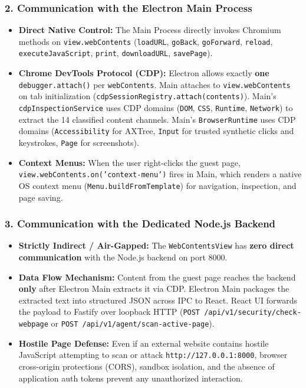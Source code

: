 \documentclass[11pt,a4paper]{article}
\begin{document}
\subsubsection{2. Communication with the Electron Main Process}
\begin{itemize}[leftmargin=1.4em]
\item \textbf{Direct Native Control:} The Main Process directly invokes Chromium methods on \texttt{view.webContents} (\texttt{loadURL}, \texttt{goBack}, \texttt{goForward}, \texttt{reload}, \texttt{executeJavaScript}, \texttt{print}, \texttt{downloadURL}, \texttt{savePage}).
\item \textbf{Chrome DevTools Protocol (CDP):} Electron allows exactly \textbf{one} \texttt{debugger.attach()} per \texttt{webContents}. Main attaches to \texttt{view.webContents} on tab initialization (\texttt{cdpSessionRegistry.attach(contents)}). Main's \texttt{cdpInspectionService} uses CDP domains (\texttt{DOM}, \texttt{CSS}, \texttt{Runtime}, \texttt{Network}) to extract the 14 classified content channels. Main's \texttt{BrowserRuntime} uses CDP domains (\texttt{Accessibility} for AXTree, \texttt{Input} for trusted synthetic clicks and keystrokes, \texttt{Page} for screenshots).
\item \textbf{Context Menus:} When the user right-clicks the guest page, \texttt{view.webContents.on('context-menu')} fires in Main, which renders a native OS context menu (\texttt{Menu.buildFromTemplate}) for navigation, inspection, and page saving.
\end{itemize}

\subsubsection{3. Communication with the Dedicated Node.js Backend}
\begin{itemize}[leftmargin=1.4em]
\item \textbf{Strictly Indirect / Air-Gapped:} The \texttt{WebContentsView} has \textbf{zero direct communication} with the Node.js backend on port 8000.
\item \textbf{Data Flow Mechanism:} Content from the guest page reaches the backend \textbf{only} after Electron Main extracts it via CDP. Electron Main packages the extracted text into structured JSON across IPC to React. React UI forwards the payload to Fastify over loopback HTTP (\texttt{POST /api/v1/security/check-webpage} or \texttt{POST /api/v1/agent/scan-active-page}).
\item \textbf{Hostile Page Defense:} Even if an external website contains hostile JavaScript attempting to scan or attack \texttt{http://127.0.0.1:8000}, browser cross-origin protections (CORS), sandbox isolation, and the absence of application auth tokens prevent any unauthorized interaction.
\end{itemize}
\end{document}

